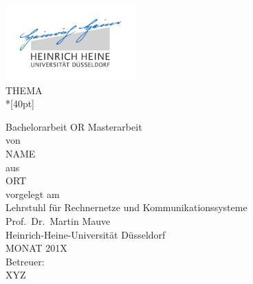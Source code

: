 %

\begin{titlepage}
  \centering
  \includegraphics[width=5cm]{figures/unilogo}\\

  \vfill
  \huge
  THEMA\\*[40pt]
  \normalsize

  \vfill
  \large
  Bachelorarbeit OR Masterarbeit\\[0.25em]
  \normalsize
  von\\
  \Large
  NAME\\

  \vspace{5mm}
  \normalsize
  aus\\ ORT\\[1cm]
  vorgelegt am\\[5mm]
  Lehrstuhl für Rechnernetze und Kommunikationssysteme\\
  Prof.\ Dr.\ Martin Mauve\\ 
  Heinrich-Heine-Universität Düsseldorf\\[0.5cm]
  MONAT 201X\\[0.5cm] %
  Betreuer:\\
  XYZ	%

\end{titlepage}

